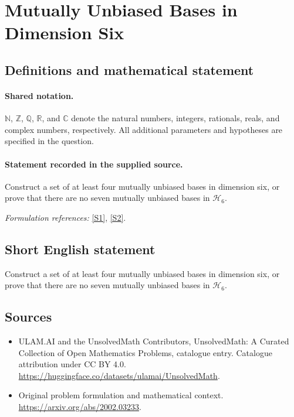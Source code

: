\documentclass[11pt]{article}
\newcommand{\sref}[2]{\hyperlink{source:#1:#2}{[S#2]}}
\begin{document}
\section{Mutually Unbiased Bases in Dimension Six}\label{statement}

\subsection{Definitions and mathematical statement}

\paragraph{Shared notation.}$\mathbb N$, $\mathbb Z$, $\mathbb Q$, $\mathbb R$, and $\mathbb C$ denote the natural numbers, integers, rationals, reals, and complex numbers, respectively. All additional parameters and hypotheses are specified in the question.


\paragraph{Statement recorded in the supplied source.}
Construct a set of at least four mutually unbiased bases in dimension six, or prove that there are no seven mutually unbiased bases in $\mathcal{H}_6$.
\par\smallskip\textit{Formulation references:} \sref{statement}{1}, \sref{statement}{2}.
\subsection{Short English statement}
Construct a set of at least four mutually unbiased bases in dimension six, or prove that there are no seven mutually unbiased bases in $\mathcal{H}_6$.
\subsection{Sources}
\begin{itemize}
\item[\hypertarget{source:statement:1}{S1}] ULAM.AI and the UnsolvedMath Contributors, UnsolvedMath: A Curated Collection of Open Mathematics Problems, catalogue entry. Catalogue attribution under CC BY 4.0.
\url{https://huggingface.co/datasets/ulamai/UnsolvedMath}.
\item[\hypertarget{source:statement:2}{S2}] Original problem formulation and mathematical context.
\url{https://arxiv.org/abs/2002.03233}.
\end{itemize}
\label{end:statement}
\end{document}

